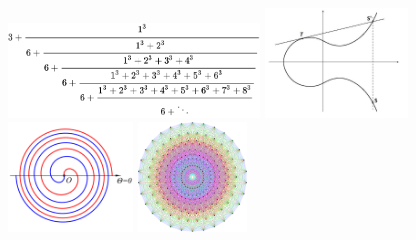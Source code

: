 \begin{figure}[h]
\begin{center}
    \includegraphics[height=2.5cm]{images/fractioncont}
    \includegraphics[height=2.9cm]{images/elliptic-curve}
    \includegraphics[height=2.9cm]{images/548px-Fermat's_spiral_01}
    \includegraphics[height=2.9cm]{images/597px-E8Petrie}
    \medskip


\end{center}
\end{figure}
